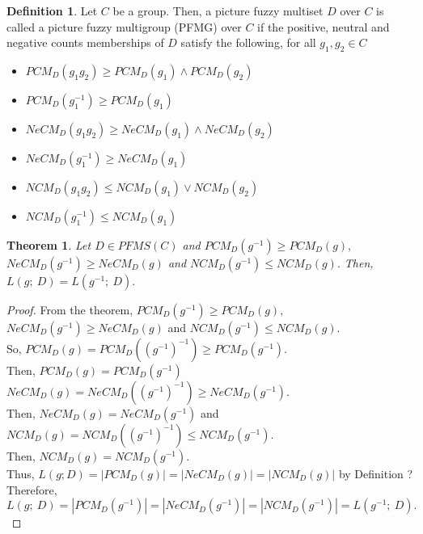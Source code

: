 \documentclass[12pt,letterpaper]{amsart}
\theoremstyle{plain}
\newtheorem{theorem}{Theorem}[section]
\theoremstyle{definition}
\newtheorem{definition}{Definition}[section]
\numberwithin{equation}{section}
\begin{document}
\begin{definition}
Let $C$ be a group. Then, a picture fuzzy multiset $D$ over $C$ is called a picture fuzzy multigroup (PFMG) over $C$ if the positive, neutral and negative counts memberships of $D$ satisfy the following, for all $g_1, g_2 \in C$
\begin{itemize}
\item [i.] $PCM_{D}(g_1 g_2) \geq PCM_{D}(g_1) \wedge PCM_{D}(g_2)$
\item [ii.] $PCM_{D}(g^{-1}_1) \geq PCM_{D}(g_1)$ 
\item [iii.] $NeCM_{D}(g_1 g_2) \geq NeCM_{D}(g_1) \wedge NeCM_{D}(g_2)$
\item [iv.] $NeCM_{D}(g^{-1}_1) \geq NeCM_{D}(g_1)$
\item [v.] $NCM_{D}(g_1 g_2) \leq NCM_{D}(g_1) \vee NCM_{D}(g_2)$
\item [vi.] $NCM_{D}(g^{-1}_1) \leq NCM_{D}(g_1)$
\end{itemize}  
\end{definition}

\begin{theorem}
Let $D \in PFMS(C)$ and  $PCM_{D}(g^{-1}) \geq PCM_{D}(g),$ $NeCM_{D}(g^{-1}) \geq NeCM_{D}(g)$ and $NCM_{D}(g^{-1}) \leq NCM_{D}(g).$ Then, $L(g;~ D) = L(g^{-1};~ D).$
\end{theorem}

\begin{proof}
From the theorem, $PCM_{D}(g^{-1}) \geq PCM_{D}(g),$ $NeCM_{D}(g^{-1}) \geq NeCM_{D}(g)$ and $NCM_{D}(g^{-1}) \leq NCM_{D}(g).$\\

So, $PCM_{D}(g) = PCM_{D}((g^{-1})^{-1}) \geq PCM_{D}(g^{-1}).$ \\ Then, $PCM_{D}(g) = PCM_{D}(g^{-1})$ \\

$NeCM_{D}(g) = NeCM_{D}((g^{-1})^{-1}) \geq NeCM_{D}(g^{-1}).$ \\ Then, $NeCM_{D}(g) = NeCM_{D}(g^{-1})$ and \\

$NCM_{D}(g) = NCM_{D}((g^{-1})^{-1}) \leq NCM_{D}(g^{-1}).$ \\ Then, $NCM_{D}(g) = NCM_{D}(g^{-1}).$\\ 

Thus, $L(g ; D) = |PCM_{D}(g)| = |NeCM_{D}(g)| = |NCM_{D}(g)|$ by Definition ?\\ Therefore, $$L(g;~ D) = |PCM_{D}(g^{-1})| = |NeCM_{D}(g^{-1})| = |NCM_{D}(g^{-1})| = L(g^{-1};~ D).$$ 
\end{proof}
\end{document}
